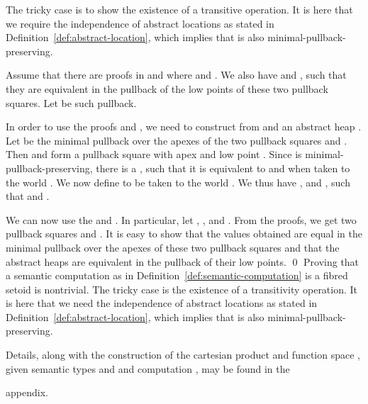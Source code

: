 \documentclass[orivec]{llncs}
\newif\iffull\fullfalse
\newif\ifapp\apptrue
\renewenvironment{proof}{\vspace{-1mm} \noindent {\bf Proof}\quad}{\qed}
\begin{document}
\begin{proof}
  The tricky case is to show the existence of a transitive operation.
  It is here that we require the independence of abstract locations as
  stated in Definition~\ref{def:abstract-location}, which implies that
   is also minimal-pullback-preserving.

Assume that there are proofs in  and  where 
 and . We also have  and , such that they are equivalent in the pullback of
the low points of these two pullback squares. Let  be such
pullback. 

In order to use the proofs  and , we need to construct
from  and  an abstract heap .
Let  be the minimal pullback over the apexes of the two pullback
squares  and . Then  and  form a pullback
square with apex  and low point . Since
 is minimal-pullback-preserving, there is a , such that it is equivalent to  and  when
taken to the world . We now define  to be  taken to the world . We thus have , and , such that  and .

We can now use the  and . In particular, 
let , , and . From the proofs, we get two
pullback squares  and . It
is easy to show that the values obtained are equal in the minimal pullback over 
the
apexes of these two pullback squares and that the abstract heaps are
equivalent in the pullback of their low points.
\end{proof} 
\else
Proving that a semantic computation  as  in
Definition~\ref{def:semantic-computation} is a fibred setoid is 
nontrivial.  The tricky case is the existence of a transitivity
 operation. 
It is here that we need the independence of abstract locations as
stated in Definition~\ref{def:abstract-location}, which implies that 
 is also minimal-pullback-preserving. 
\fi
\iffull
\begin{definition}[cartesian product]
If  and  are semantic types their cartesian product  is defined by  (cartesian product of setoids) and . 
\end{definition}
\begin{definition}[function space]
  Let  be a semantic type and  be a
  semantic computation. We define a semantic type  as follows.  
  An object  of  is a pair  of
  continuous functions where  assigns to each  and
   a continuous function . The second component  assigns to each
   and  a continuous
  function .


  If  then a proof  is a continuous function assigning to each
   and  a proof .

  If  and 
  then  is given by precomposition with
  , i.e., , etc.



  As for the realisation relation  we put
   to mean that  for some
   and whenever  is an inclusion and
   then .
\end{definition}
Notice that unlike morphisms the elements of the function space are \emph{not} identified if they are ``provably equal.''. 
Notice also that if  implies
 whenever 
is an inclusion.
\else
Details, along with the construction of the cartesian product
 and function space
 , given semantic types
  and  and computation ,
may be found in the 
\ifapp
appendix.
\else
long version of the paper.
\fi
\fi
\end{document}
